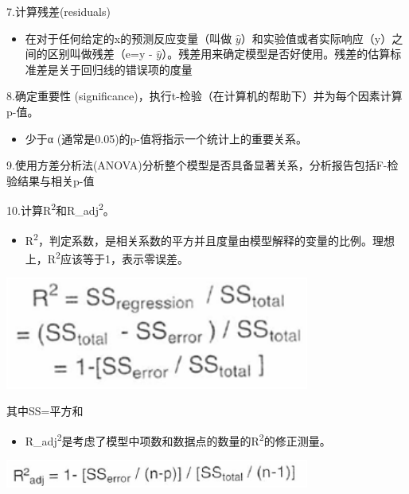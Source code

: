 7.计算残差(residuals)\\


\begin{itemize}
\tightlist
\item
  在对于任何给定的x的预测反应变量（叫做
  \(\hat y\)）和实验值或者实际响应（y）之间的区别叫做残差（e=y -
  \(\hat y\)）。残差用来确定模型是否好使用。残差的估算标准差是关于回归线的错误项的度量
\end{itemize}


8.确定重要性 (significance)，执行t-检验（在计算机的帮助下）并为每个因素计算p-值。\\


\begin{itemize}
\tightlist
\item
  少于α (通常是0.05)的p-值将指示一个统计上的重要关系。
\end{itemize}

9.使用方差分析法(ANOVA)分析整个模型是否具备显著关系，分析报告包括F-检验结果与相关p-值

10.计算R\textsuperscript{2}和R\_adj\textsuperscript{2}。


\begin{itemize}
\tightlist
\item
  R\textsuperscript{2}，判定系数，是相关系数的平方并且度量由模型解释的变量的比例。理想上，R\textsuperscript{2}应该等于1，表示零误差。
\end{itemize}


\includegraphics[width=10cm]{相关性10.png}

其中SS=平方和

\begin{itemize}
\tightlist
\item
  R\_adj\textsuperscript{2}是考虑了模型中项数和数据点的数量的R\textsuperscript{2}的修正测量。
\end{itemize}


\includegraphics[width=10cm]{相关性11.png}

